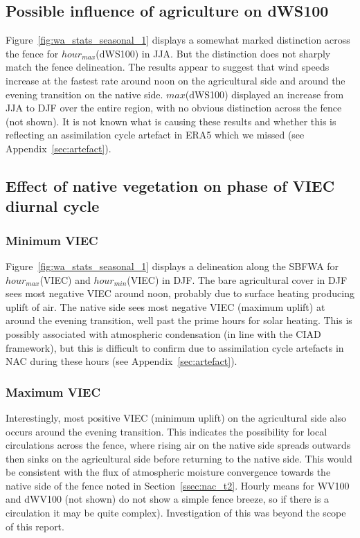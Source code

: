 \subsection{Possible influence of agriculture on dWS100}

Figure~\ref{fig:wa_stats_seasonal_1} displays a somewhat marked distinction across the fence for $hour_{max}$(\acs{dWS100}) in \ac{JJA}. But the distinction does not sharply match the fence delineation. The results appear to suggest that wind speeds increase at the fastest rate around noon on the agricultural side and around the evening transition on the native side. $max$(\acs{dWS100}) displayed an increase from \ac{JJA} to \ac{DJF} over the entire region, with no obvious distinction across the fence (not shown). It is not known what is causing these results and whether this is reflecting an assimilation cycle artefact in \ac{ERA5} which we missed (see Appendix~\ref{sec:artefact}).

\subsection[Effect of native vegetation on VIEC diurnal phase]{Effect of native vegetation on phase of VIEC diurnal cycle}

\subsubsection{Minimum VIEC}

Figure~\ref{fig:wa_stats_seasonal_1} displays a delineation along the \ac{SBFWA} for $hour_{max}$(\acs{VIEC}) and $hour_{min}$(\acs{VIEC}) in \ac{DJF}. The bare agricultural cover in \ac{DJF} sees most negative \ac{VIEC} around noon, probably due to surface heating producing uplift of air. The native side sees most negative \ac{VIEC} (maximum uplift) at around the evening transition, well past the prime hours for solar heating. This is possibly associated with atmospheric condensation (in line with the \ac{CIAD} framework), but this is difficult to confirm due to assimilation cycle artefacts in \ac{NAC} during these hours (see Appendix~\ref{sec:artefact}).

\subsubsection{Maximum VIEC}

Interestingly, most positive \ac{VIEC} (minimum uplift) on the agricultural side also occurs around the evening transition. This indicates the possibility for local circulations across the fence, where rising air on the native side spreads outwards then sinks on the agricultural side before returning to the native side. This would be consistent with the flux of atmospheric moisture convergence towards the native side of the fence noted in Section~\ref{ssec:nac_t2}. Hourly means for \ac{WV100} and \ac{dWV100} (not shown) do not show a simple fence breeze, so if there is a circulation it may be quite complex). Investigation of this was beyond the scope of this report.

